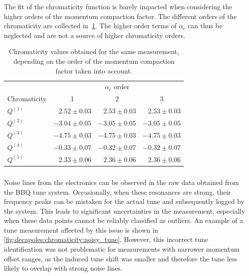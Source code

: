 The fit of the chromaticity function is barely impacted when considering the higher orders of the 
momentum compaction factor. The different orders of the chromaticity are collected
in~\cref{table:decapoles:chromaticity:alpha_c_chroma}.
The higher order terms of $\alpha_c$ can thus be neglected and are not a source of higher
chromaticity orders.

\begin{table}[!htb]
    \centering
    \begin{tabular}{lrrr}
      \toprule
                  & \multicolumn{3}{c}{$\alpha_c$ order} \\
      Chromaticity &  \multicolumn{1}{c}{1}  &  \multicolumn{1}{c}{2} &  \multicolumn{1}{c}{3} \\
      \midrule
      $Q^{(1)}$ & $ 2.52 \pm 0.03$ & $ 2.53 \pm 0.03$ & $ 2.53 \pm 0.03$ \\
      $Q^{(2)}$ & $-3.04 \pm 0.05$ & $-3.05 \pm 0.05$ & $-3.05 \pm 0.05$ \\
      $Q^{(3)}$ & $-4.75 \pm 0.03$ & $-4.75 \pm 0.03$ & $-4.75 \pm 0.03$ \\
      $Q^{(4)}$ & $-0.33 \pm 0.07$ & $-0.32 \pm 0.07$ & $-0.32 \pm 0.07$ \\
      $Q^{(5)}$ & $ 2.33 \pm 0.06$ & $ 2.36 \pm 0.06$ & $ 2.36 \pm 0.06$ \\
      \bottomrule
    \end{tabular}
    \caption{Chromaticity values obtained for the same measurement, depending on the order of the
    momentum compaction factor taken into account.}
    \label{table:decapoles:chromaticity:alpha_c_chroma}
\end{table}     



\FloatBarrier
\subsubsection{}

Noise lines from the electronics can be observed in the raw data obtained from the BBQ tune system.
Occasionally, when these resonances are strong, their frequency peaks can be mistaken for the actual
tune and subsequently logged by the system. This leads to significant uncertainties in the
measurement, especially when these data points cannot be reliably classified as outliers. An example
of a tune measurement affected by this issue is shown in
\cref{fig:decapoles:chromaticity:noisy_tune}. However, this incorrect tune identification was not
problematic for measurements with narrower momentum offset ranges, as the induced tune shift was
smaller and therefore the tune less likely to overlap with strong noise lines.

